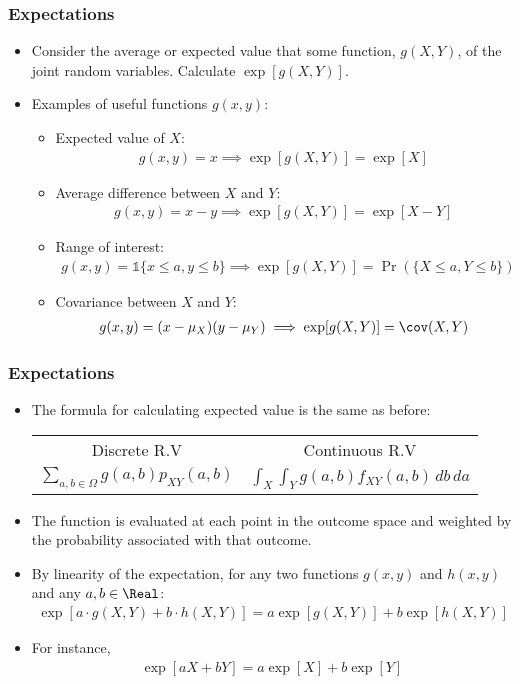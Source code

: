 \begin{frame}
\frametitle{Expectations} 
\begin{itemize}
\item Consider the average or expected value that some function, $g(X,Y)$, of the joint random variables. Calculate $\exp[g(X,Y)]$. 
\item  Examples of useful functions $g(x,y)$:
\begin{itemize}
\item Expected value of $X$: 
\begin{align*}
g(x,y) = x\implies \exp[g(X,Y)] = \exp[X]
\end{align*}
\item Average difference between $X$ and $Y$: 
\begin{align*}
g(x,y) = x-y\implies \exp[g(X,Y)]= \exp[X-Y]
\end{align*}
\item Range of interest: 
\begin{align*}
g(x,y) = \mathds{1}\{x\leq a, y\leq b\}\implies \exp[g(X,Y)] = \Pr(\{X\leq a,Y\leq b\})
\end{align*}
\item Covariance between $X$ and $Y$: 
\begin{align*}
g(x,y) = (x-\mu_X)(y-\mu_Y)\implies \exp[g(X,Y)]= \cov(X,Y)
\end{align*}
\end{itemize}
\end{itemize}
\end{frame}


\begin{frame}
\frametitle{Expectations} 
\begin{itemize}
\item The formula for calculating expected value is the same as before:
\begin{center}
\begin{tabular}{cc}
\toprule
Discrete R.V & Continuous R.V \\
$\sum_{a,b\in\Omega} g(a,b) p_{XY}(a,b)$ 
    & $\int_{X} \int_Y g(a,b) f_{XY}(a,b)\,db\,da$\\
\bottomrule
\end{tabular}
\end{center}
\item The function is evaluated at each point in the outcome space and weighted by the probability associated with that outcome.
\item By linearity of the expectation, for any two functions $g(x,y)$ and $h(x,y)$ and any $a,b\in\Real$:
\begin{align*}
\exp[a\cdot g(X,Y) + b\cdot h(X,Y)] = a\exp[g(X,Y)] + b\exp[h(X,Y)]
\end{align*} 
\item For instance,
\begin{align*}
\exp[aX+bY] = a\exp[X]+b\exp[Y]
\end{align*} 
\end{itemize}
\end{frame}


